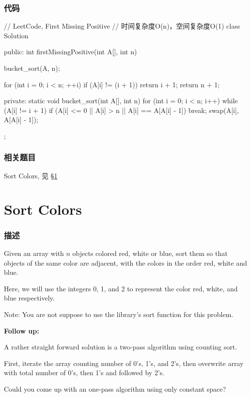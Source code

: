 \subsubsection{代码}
\begin{Code}
// LeetCode, First Missing Positive
// 时间复杂度O(n)，空间复杂度O(1)
class Solution {
public:
    int firstMissingPositive(int A[], int n) {
        bucket_sort(A, n);
        
        for (int i = 0; i < n; ++i)
            if (A[i] != (i + 1))
                return i + 1;
        return n + 1;
    }
private:
    static void bucket_sort(int A[], int n) {
        for (int i = 0; i < n; i++) {
            while (A[i] != i + 1) {
                if (A[i] <= 0 || A[i] > n || A[i] == A[A[i] - 1])
                    break;
                swap(A[i], A[A[i] - 1]);
            }
        }
    }
};
\end{Code}


\subsubsection{相关题目}
\begindot
\item Sort Colors, 见 \S \ref{sec:sort-colors}
\myenddot


\section{Sort Colors} %
\label{sec:sort-colors}


\subsubsection{描述}
Given an array with $n$ objects colored red, white or blue, sort them so that objects of the same color are adjacent, with the colors in the order red, white and blue.

Here, we will use the integers 0, 1, and 2 to represent the color red, white, and blue respectively.

Note:
You are not suppose to use the library's sort function for this problem.

\textbf{Follow up:}

A rather straight forward solution is a two-pass algorithm using counting sort.

First, iterate the array counting number of 0's, 1's, and 2's, then overwrite array with total number of 0's, then 1's and followed by 2's.

Could you come up with an one-pass algorithm using only constant space?


